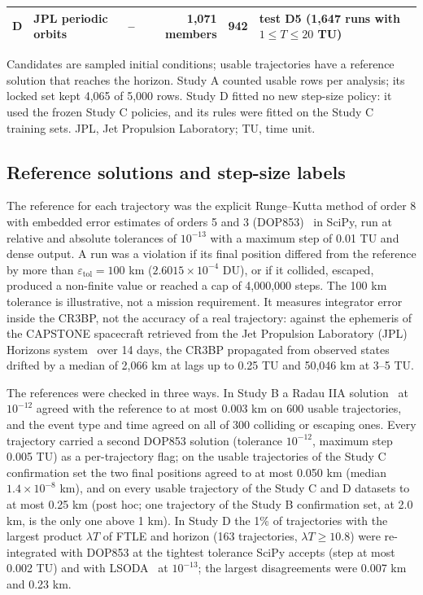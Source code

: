 \documentclass[10pt,letterpaper]{article}
\newcommand{\tol}{\varepsilon_{\mathrm{tol}}}
\begin{document}
\begin{table}[!ht]
\begin{tabular}{|l|L{1.3in}|r|r|r|L{1.95in}|}
D & JPL periodic orbits & -- & 1,071 members & 942 & test D5 (1,647 runs with $1 \le T \le 20$ TU) \\ \hline
\end{tabular}
\begin{flushleft} Candidates are sampled initial conditions; usable trajectories have a reference solution that reaches the horizon. Study A counted usable rows per analysis; its locked set kept 4,065 of 5,000 rows. Study D fitted no new step-size policy: it used the frozen Study C policies, and its rules were fitted on the Study C training sets. JPL, Jet Propulsion Laboratory; TU, time unit.
\end{flushleft}
\label{table1}
\end{table}

\subsection*{Reference solutions and step-size labels}
The reference for each trajectory was the explicit Runge--Kutta method of order 8 with embedded error estimates of orders 5 and 3 (DOP853)~\cite{hairer1993} in SciPy, run at relative and absolute tolerances of $10^{-13}$ with a maximum step of 0.01 TU and dense output. A run was a violation if its final position differed from the reference by more than $\tol = 100$ km ($2.6015\times10^{-4}$ DU), or if it collided, escaped, produced a non-finite value or reached a cap of 4,000,000 steps. The 100 km tolerance is illustrative, not a mission requirement. It measures integrator error inside the CR3BP, not the accuracy of a real trajectory: against the ephemeris of the CAPSTONE spacecraft retrieved from the Jet Propulsion Laboratory (JPL) Horizons system~\cite{giorgini1996} over 14 days, the CR3BP propagated from observed states drifted by a median of 2,066 km at lags up to 0.25 TU and 50,046 km at 3--5 TU.

The references were checked in three ways. In Study B a Radau IIA solution~\cite{hairer1996} at $10^{-12}$ agreed with the reference to at most 0.003 km on 600 usable trajectories, and the event type and time agreed on all of 300 colliding or escaping ones. Every trajectory carried a second DOP853 solution (tolerance $10^{-12}$, maximum step 0.005 TU) as a per-trajectory flag; on the usable trajectories of the Study C confirmation set the two final positions agreed to at most 0.050 km (median $1.4\times10^{-8}$ km), and on every usable trajectory of the Study C and D datasets to at most 0.25 km (post hoc; one trajectory of the Study B confirmation set, at 2.0 km, is the only one above 1 km). In Study D the 1\% of trajectories with the largest product $\lambda T$ of FTLE and horizon (163 trajectories, $\lambda T \ge 10.8$) were re-integrated with DOP853 at the tightest tolerance SciPy accepts (step at most 0.002 TU) and with LSODA~\cite{petzold1983} at $10^{-13}$; the largest disagreements were 0.007 km and 0.23 km.
\end{document}
